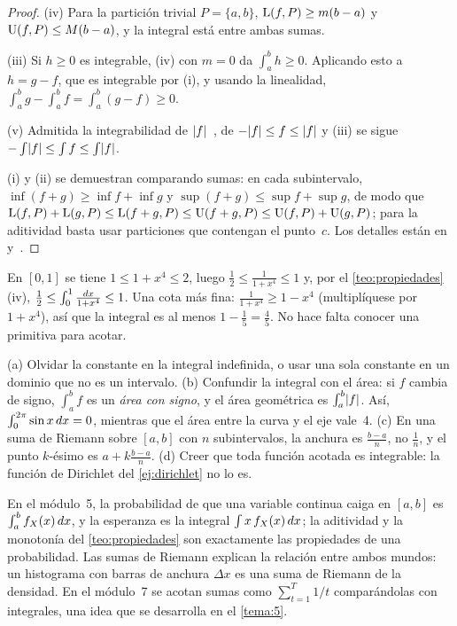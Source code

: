 \begin{proof}
(iv) Para la partición trivial $P=\{a,b\}$, $\operatorname{L}(f,P)\ge m(b-a)$ y $\operatorname{U}(f,P)\le M(b-a)$, y la integral está entre ambas sumas.

(iii) Si $h\ge0$ es integrable, (iv) con $m=0$ da $\int_a^b h\ge0$. Aplicando esto a $h=g-f$, que es integrable por (i), y usando la linealidad, $\int_a^b g-\int_a^b f=\int_a^b(g-f)\ge0$.

(v) Admitida la integrabilidad de $\lvert f\rvert$~\cite[cap.~13]{spivak}, de $-\lvert f\rvert\le f\le\lvert f\rvert$ y (iii) se sigue $-\int\lvert f\rvert\le\int f\le\int\lvert f\rvert$.

(i) y (ii) se demuestran comparando sumas: en cada subintervalo, $\inf(f+g)\ge\inf f+\inf g$ y $\sup(f+g)\le\sup f+\sup g$, de modo que $\operatorname{L}(f,P)+\operatorname{L}(g,P)\le\operatorname{L}(f+g,P)\le\operatorname{U}(f+g,P)\le\operatorname{U}(f,P)+\operatorname{U}(g,P)$; para la aditividad basta usar particiones que contengan el punto~$c$. Los detalles están en~\cite[cap.~13]{spivak} y~\cite[cap.~1]{apostol}.
\end{proof}

\begin{ejemplo}\label{ej:estimacion}
En $[0,1]$ se tiene $1\le1+x^{4}\le2$, luego $\frac12\le\frac{1}{1+x^{4}}\le1$ y, por el \cref{teo:propiedades}(iv), $\frac12\le\int_0^1\frac{\mathop{}\!d x}{1+x^{4}}\le1$. Una cota más fina: $\frac{1}{1+x^{4}}\ge1-x^{4}$ (multiplíquese por $1+x^{4}$), así que la integral es al menos $1-\frac15=\frac45$. No hace falta conocer una primitiva para acotar.
\end{ejemplo}

\begin{observacion}\label{obs:1-errores}
(a) Olvidar la constante en la integral indefinida, o usar una sola constante en un dominio que no es un intervalo. (b) Confundir la integral con el área: si $f$ cambia de signo, $\int_a^b f$ es un \emph{área con signo}, y el área geométrica es $\int_a^b\lvert f\rvert$. Así, $\int_0^{2\pi}\sin x\mathop{}\!d x=0$, mientras que el área entre la curva y el eje vale~4. (c) En una suma de Riemann sobre $[a,b]$ con $n$ subintervalos, la anchura es $\frac{b-a}{n}$, no $\frac1n$, y el punto $k$-ésimo es $a+k\frac{b-a}{n}$. (d) Creer que toda función acotada es integrable: la función de Dirichlet del \cref{ej:dirichlet} no lo es.
\end{observacion}

\begin{observacion}
En el módulo~5, la probabilidad de que una variable continua caiga en $[a,b]$ es $\int_a^b f_X(x)\mathop{}\!d x$, y la esperanza es la integral $\int x\,f_X(x)\mathop{}\!d x$; la aditividad y la monotonía del \cref{teo:propiedades} son exactamente las propiedades de una probabilidad. Las sumas de Riemann explican la relación entre ambos mundos: un histograma con barras de anchura $\Delta x$ es una suma de Riemann de la densidad. En el módulo~7 se acotan sumas como $\sum_{t=1}^{T}1/t$ comparándolas con integrales, una idea que se desarrolla en el \cref{tema:5}.
\end{observacion}

